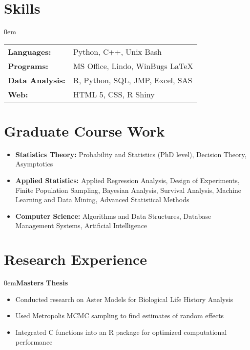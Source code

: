 \documentclass[10pt]{article}
\newenvironment{am}{\begin{addmargin}[1em]{0em}}{\end{addmargin}}
\newcommand{\Experience}[3]{\begin{am}\textbf{#1} \ \ \ \ \emph{{\color{LightGray}{#2}}} \hfill {#3} \end{am}}
\begin{document}
\section*{Skills}

\begin{am}
\begin{tabular}{l l}
  \textbf{Languages:}			& Python, C++, Unix Bash \\
  \textbf{Programs:} 			& MS Office, Lindo, WinBugs \LaTeX \\
  \textbf{Data Analysis:}		& R, Python, SQL, JMP, Excel, SAS \\
  \textbf{Web:}                         & HTML 5, CSS, R Shiny
\end{tabular}
\end{am}


\section*{Graduate Course Work}
\begin{itemize}[noitemsep]
  \item \textbf{Statistics Theory:} Probability and Statistics (PhD level),
    Decision Theory, Asymptotics
  \item \textbf{Applied Statistics:} Applied Regression Analysis, Design of
    Experiments, Finite Population Sampling, Bayesian Analysis, Survival
    Analysis, Machine Learning and Data Mining, Advanced Statistical Methods
  \item \textbf{Computer Science:} Algorithms and Data Structures, Database Management
    Systems, Artificial Intelligence
\end{itemize}

\section*{Research Experience}
\Experience{Masters Thesis}{}{}
\begin{itemize}[noitemsep]
  \item Conducted research on Aster Models for Biological Life History Analysis
  \item Used Metropolis MCMC sampling to find estimates of random effects
  \item Integrated C functions into an R package for optimized computational
    performance
\end{itemize}
\end{document}
